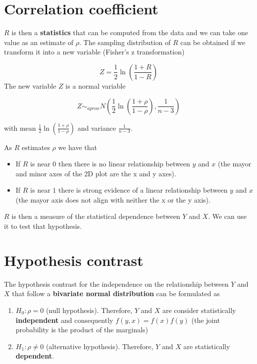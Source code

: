 \documentclass[
]{book}
\begin{document}
\hypertarget{correlation-coefficient}{%
\section{Correlation coefficient}\label{correlation-coefficient}}

\(R\) is then a \textbf{statistics} that can be computed from the data and we can take one value as an estimate of \(\rho\). The sampling distribution of \(R\) can be obtained if we transform it into a new variable (Fisher's z transformation)

\[Z=\frac{1}{2}\ln (\frac{1+R}{1-R})\]
The new variable \(Z\) is a normal variable

\[Z \sim_{aprox} N(\frac{1}{2}\ln (\frac{1+\rho}{1-\rho}), \frac{1}{n-3})\]

with mean \(\frac{1}{2}\ln (\frac{1+\rho}{1-\rho})\) and variance \(\frac{1}{n-3}\).

As \(R\) estimates \(\rho\) we have that

\begin{itemize}
\item
  If \(R\) is near \(0\) then there is no linear relationship between \(y\) and \(x\) (the mayor and minor axes of the 2D plot are the x and y axes).
\item
  If \(R\) is near \(1\) there is strong evidence of a linear relationship between \(y\) and \(x\) (the mayor axis does not align with neither the x or the y axis).
\end{itemize}

\(R\) is then a measure of the statistical dependence between \(Y\) and \(X\). We can use it to test that hypothesis.

\hypertarget{hypothesis-contrast}{%
\section{Hypothesis contrast}\label{hypothesis-contrast}}

The hypothesis contrast for the independence on the relationship between \(Y\) and \(X\) that follow a \textbf{bivariate normal distribution} can be formulated as

\begin{enumerate}
\def\labelenumi{\alph{enumi}.}
\item
  \(H_0: \rho=0\) (null hypothesis). Therefore, \(Y\) and \(X\) are consider statistically \textbf{independent} and consequently \(f(y,x)=f(x)f(y)\) (the joint probability is the product of the marginals)
\item
  \(H_1: \rho \neq 0\) (alternative hypothesis). Therefore, \(Y\) and \(X\) are statistically \textbf{dependent}.
\end{enumerate}
\end{document}
